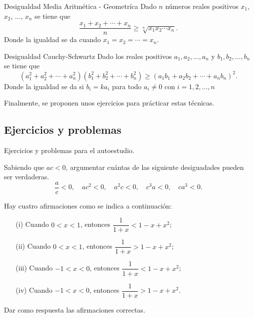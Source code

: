 \begin{theorem.box}{Desigualdad Media Aritmética - Geometríca}{}
    Dado $n$ números reales positivos $x_1$, $x_2$, $\ldots$, $x_n$ se tiene que
    \[
        \dfrac{x_1 + x_2 + \cdots + x_n}{n} \geq \sqrt[n]{x_1 x_2 \cdots x_n}.
    \]
    Donde la igualdad se da cuando $x_1 = x_2 = \cdots = x_n$.
\end{theorem.box}

\begin{theorem.box}{Desigualdad Cauchy-Schwartz}{}
    Dado los reales positivos $a_1, a_2, \ldots, a_n$ y $b_1, b_2, \ldots, b_n$ se tiene que
    \[
        (a_1^2 + a_2^2 + \cdots + a_n^2)(b_1^2 + b_2^2 + \cdots + b_n^2) \geq (a_1 b_1 + a_2 b_2 + \cdots + a_n b_n)^2.
    \]
    Donde la igualdad se da si $b_i = k a_i$ para todo $a_i \neq 0$ con $i = 1, 2, \ldots, n$
\end{theorem.box}

Finalmente, se proponen unos ejercicios para prácticar estas técnicas.



\subsection{Ejercicios y problemas}

Ejercicios y problemas para el autoestudio.

\begin{exercise}
    Sabiendo que $ac < 0$, argumentar cuántas de las siguiente desiguadades pueden ser verdaderas.
    \[
        \frac{a}{c} < 0,\quad ac^2 < 0,\quad a^2 c < 0,\quad c^3 a < 0,\quad ca^3 < 0.
    \]
\end{exercise}

\begin{exercise}
    Hay cuatro afirmaciones como se indica a continuación:
    \begin{itemize}
        \item[(i)] Cuando $0 < x < 1$, entonces $\dfrac{1}{1 + x} < 1 - x + x^2$;
        \item[(ii)] Cuando $0 < x < 1$, entonces $\dfrac{1}{1 + x} > 1 - x + x^2$;
        \item[(iii)] Cuando $-1 < x < 0$, entonces $\dfrac{1}{1 + x} < 1 - x + x^2$;
        \item[(iv)] Cuando $-1 < x < 0$, entonces $\dfrac{1}{1 + x} > 1 - x + x^2$.
    \end{itemize}
    Dar como respuesta las afirmaciones correctas.
\end{exercise}

